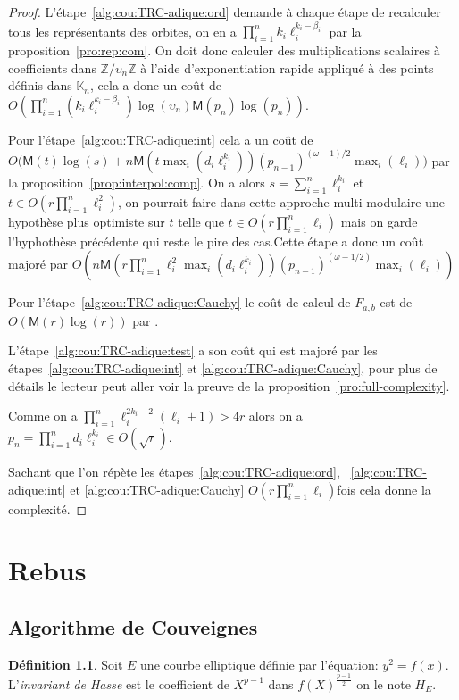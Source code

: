 \documentclass[10pt,a4paper]{book}
\theoremstyle{plain}
\theoremstyle{definition}
\theoremstyle{definition}
\theoremstyle{definition}
\theoremstyle{definition}
\newtheorem{defi}[thm]{Définition}
\theoremstyle{remark}
\theoremstyle{remark}
\theoremstyle{definition}
\begin{document}
\begin{proof}
L'étape~\ref{alg:cou:TRC-adique:ord} demande à chaque étape de recalculer tous les 
représentants des orbites, on en a $\prod_{i=1}^n k_i\ell_i^{k_i-\beta_i}$ par
la proposition~\ref{pro:rep:com}. 
On doit donc calculer des multiplications scalaires à coefficients dans 
$\mathbb{Z}/\upsilon_n \mathbb{Z}$ à l'aide d'exponentiation rapide appliqué à
des points définis dans $\mathbb{K}_n$, cela a donc un coût de  
$O(\prod_{i=1}^n (k_i\ell_i^{k_i-\beta_i})\log(\upsilon_n) \mathsf{M}(p_n)\log(p_n))$.

Pour l'étape~\ref{alg:cou:TRC-adique:int} cela a un coût de 
$O\bigl(\mathsf{M}(t)\log(s) + n\mathsf{M}(t \max_i(d_i\ell_i^{k_i}))(p_{n-1})^{(\omega-1)/2} \max_{i}(\ell_{i})\bigr)$ 
 par la proposition~\ref{prop:interpol:comp}. On a alors 
 $s=\sum_{i=1}^n\ell_i^{k_i}$ et $t \in O(r \prod_{i=1}^n\ell_i^{2})$, on 
 pourrait faire dans cette approche multi-modulaire une hypothèse plus 
 optimiste sur $t$ telle que $t \in O(r \prod_{i=1}^n\ell_i)$ mais on garde 
 l'hyphothèse précédente qui reste le pire des cas.Cette étape a donc un coût 
 majoré par 
 $O(n\mathsf{M}(r \prod_{i=1}^n \ell_i^2 \max_i(d_i \ell_i^{k_i}))(p_{n-1})^{(\omega-1/2)}\max_i(\ell_i))$

Pour l'étape~\ref{alg:cou:TRC-adique:Cauchy} le coût de calcul de $F_{a,b}$ est de 
$O(\mathsf{M}(r)\log(r))$ par \cite[Théorème 7.5]{algeff17}.

L'étape~\ref{alg:cou:TRC-adique:test} a son coût qui est majoré par les 
étapes~\ref{alg:cou:TRC-adique:int} et \ref{alg:cou:TRC-adique:Cauchy}, pour plus de 
détails le lecteur peut aller voir la preuve de la 
proposition~\ref{pro:full-complexity}.

Comme on a $\prod_{i=1}^n\ell_{i}^{2k_{i}-2}(\ell_{i}+1)>4r$ alors on a 
$p_n=\prod_{i=1}^nd_i\ell_i^{k_i} \in O(\sqrt{r})$. 

Sachant que l'on répète les étapes~\ref{alg:cou:TRC-adique:ord}, 
~\ref{alg:cou:TRC-adique:int} et \ref{alg:cou:TRC-adique:Cauchy}  $O(r \prod_{i=1}^n\ell_i)$fois cela donne la 
complexité.
\end{proof}

\chapter{Rebus}
\section{Algorithme de Couveignes}

\begin{defi}
Soit $E$ une courbe elliptique définie par l'équation: $y^2=f(x)$. L'\emph{invariant de Hasse} est le coefficient de $X^{p-1}$ dans $f(X)^{\frac{p-1}{2}}$ on le note $H_{E}$.
\end{defi}
\end{document}
